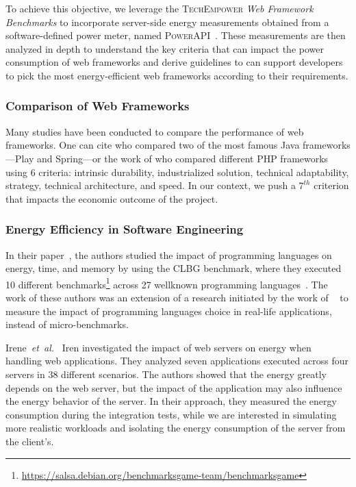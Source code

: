 To achieve this objective, we leverage the \textsc{TechEmpower} \emph{Web Framework Benchmarks} to incorporate server-side energy measurements obtained from a software-defined power meter, named \textsc{PowerAPI}~\cite{fieni2020smartwatts}.
These measurements are then analyzed in depth to understand the key criteria that can impact the power consumption of web frameworks and derive guidelines to can support developers to pick the most energy-efficient web frameworks according to their requirements.

\subsubsection{Comparison of Web Frameworks}
Many studies have been conducted to compare the performance of web frameworks.
One can cite \cite{gajewski_analysis_2019} who compared two of the most famous Java frameworks---Play and Spring---or the work of \cite{benmoussa_new_2019} who compared different PHP frameworks using 6 criteria: intrinsic durability, industrialized solution, technical adaptability, strategy, technical architecture, and speed.
In our context, we push a $7^{th}$ criterion that impacts the economic outcome of the project.

\subsubsection{Energy Efficiency in Software Engineering}

In their paper~\cite{pereira_energy_2017}, the authors studied the impact of programming languages on energy, time, and memory by using the CLBG benchmark, where they executed 10 different benchmarks\footnote{\url{https://salsa.debian.org/benchmarksgame-team/benchmarksgame}} across 27 wellknown programming languages~\cite{noauthor_pypl_2018}.
The work of these authors was an extension of a research initiated by the work of \citeauthor{couto2017towards}~\cite{couto2017towards} to measure the impact of programming languages choice in real-life applications, instead of micro-benchmarks.

Irene~\emph{et~al.}~\cite{manotas_investigating_2013} Iren investigated the impact of web servers on energy when handling web applications.
They analyzed seven applications executed across four servers in 38 different scenarios.
The authors showed that the energy greatly depends on the web server, but the impact of the application may also influence the energy behavior of the server.
In their approach, they measured the energy consumption during the integration tests, while we are interested in simulating more realistic workloads and isolating the energy consumption of the server from the client's.

